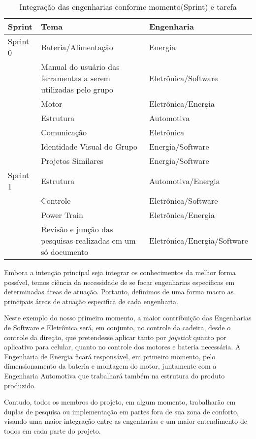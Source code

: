 \begin{table}[!ht]
\centering
\caption{Integração das engenharias conforme momento(Sprint) e tarefa}
\begin{tabular}{|p{2cm}|p{6cm}|p{5cm}|}
\hline
Sprint & Tema & Engenharia \\ \hline
Sprint 0 & Bateria/Alimentação & Energia \\ \hline
 & Manual do usuário das ferramentas a serem utilizadas pelo grupo & Eletrônica/Software \\ \hline
 & Motor & Eletrônica/Energia \\ \hline
 & Estrutura & Automotiva \\ \hline
 & Comunicação & Eletrônica \\ \hline
 & Identidade Visual do Grupo & Energia/Software \\ \hline
 & Projetos Similares & Energia/Software \\ \hline
Sprint 1 & Estrutura & Automotiva/Energia \\ \hline
 & Controle & Eletrônica/Software \\ \hline
 & Power Train & Eletrônica/Energia \\ \hline
 & Revisão e junção das pesquisas realizadas em um só documento & Eletrônica/Energia/Software \\ \hline
\end{tabular}
\label{tab:integracao}
\end{table}

Embora a intenção principal seja integrar os conhecimentos da melhor forma possível, temos ciência da necessidade de se focar engenharias especificas em determinadas áreas de atuação. Portanto, definimos de uma forma macro as principais áreas de atuação especifica de cada engenharia.

Neste exemplo do nosso primeiro momento, a maior contribuição das Engenharias de Software e Eletrônica será, em conjunto, no controle da cadeira, desde o controle da direção, que pretendesse aplicar tanto por \textit{joystick} quanto por aplicativo para celular, quanto no controle dos motores e bateria necessária. A Engenharia de Energia ficará responsável, em primeiro momento, pelo dimensionamento da bateria e montagem do motor, juntamente com a Engenharia Automotiva que trabalhará também na estrutura do produto produzido.

Contudo, todos os membros do projeto, em algum momento, trabalharão em duplas de pesquisa ou implementação em partes fora de sua zona de conforto, visando uma maior integração entre as engenharias e um maior entendimento de todos em cada parte do projeto.
